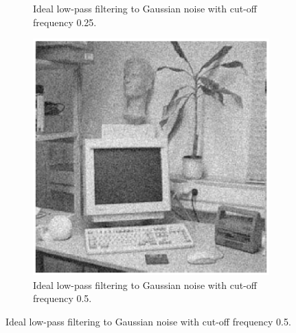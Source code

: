\documentclass[11pt,a4paper]{article}
\begin{document}
\begin{itemize}
\begin{figure}[!ht]
\begin{subfigure}[t]{.32\linewidth}
			\caption{\scriptsize Ideal low-pass filtering to Gaussian noise with cut-off frequency 0.25.}
			\label{fig:lowpassToGauss0.25}
		\end{subfigure}
		\begin{subfigure}[t]{.32\linewidth} %
			\includegraphics[width=\columnwidth]{Q17_Lowpass_to_Gauss_0_5.eps}
			\caption{\scriptsize Ideal low-pass filtering to Gaussian noise with cut-off frequency 0.5.}
			\label{fig:lowpassToGauss0.5}
		\end{subfigure}


\end{figure}
\end{itemize}
\end{document}

